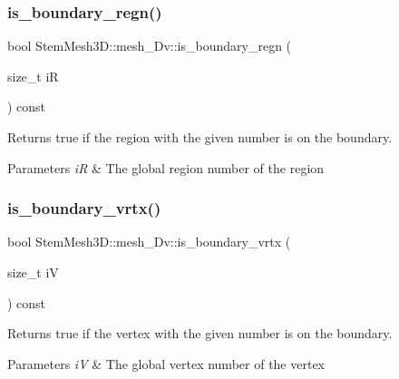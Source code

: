 \subsubsection{\texorpdfstring{is\+\_\+boundary\+\_\+regn()}{is\_boundary\_regn()}}
{\footnotesize\ttfamily bool Stem\+Mesh3\+D\+::mesh\+\_\+Dv\+::is\+\_\+boundary\+\_\+regn (\begin{DoxyParamCaption}\item[{size\+\_\+t}]{iR }\end{DoxyParamCaption}) const}



Returns true if the region with the given number is on the boundary. 


\begin{DoxyParams}{Parameters}
{\em iR} & The global region number of the region \\
\hline
\end{DoxyParams}
\mbox{\label{classStemMesh3D_1_1mesh__3Dv_aa6ba589981c83feda412066fd0580032}} 
\subsubsection{\texorpdfstring{is\+\_\+boundary\+\_\+vrtx()}{is\_boundary\_vrtx()}}
{\footnotesize\ttfamily bool Stem\+Mesh3\+D\+::mesh\+\_\+Dv\+::is\+\_\+boundary\+\_\+vrtx (\begin{DoxyParamCaption}\item[{size\+\_\+t}]{iV }\end{DoxyParamCaption}) const}



Returns true if the vertex with the given number is on the boundary. 


\begin{DoxyParams}{Parameters}
{\em iV} & The global vertex number of the vertex \\
\hline
\end{DoxyParams}
\mbox{\label{classStemMesh3D_1_1mesh__3Dv_ae4e6b4995cb4169fdb930a508d0b83de}} 
